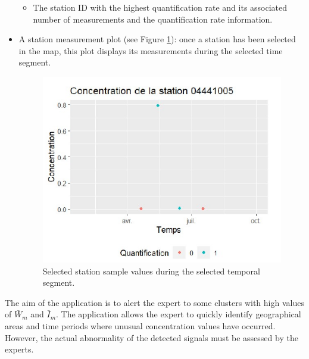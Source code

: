 \begin{itemize}
\begin{itemize}
\item The station ID with the highest quantification rate and its associated number of measurements and the quantification rate information.
\end{itemize} 
\item A station measurement plot (see Figure \ref{fig:Imapp9}): once a station has been selected in the map, this plot displays its measurements during the selected time segment. 
\begin{figure}[htbp]
 \centering
 \includegraphics[]{figs/Chap6/Im_appbis9.pdf}
 \caption{Selected station sample values during the selected temporal segment.}
 \label{fig:Imapp9}
\end{figure}
\end{itemize}


The aim of the application is to alert the expert to some clusters with high values of $\bar{W}_m$ and $\bar{I}_m$. The application allows the expert to quickly identify geographical areas and time periods where unusual concentration values have occurred. However, the actual abnormality of the detected signals must be assessed by the experts.


